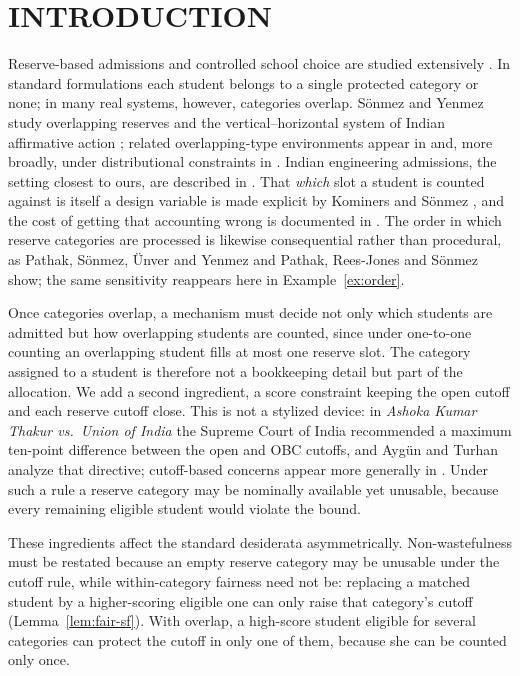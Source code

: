 \documentclass[a4paper,twoside]{article}
\theoremstyle{definition}
\begin{document}
\section{\uppercase{Introduction}}
Reserve-based admissions and controlled school choice are studied extensively \cite{Abdu05a,EHYY14a,HYY13a,EcYe15a,AyTu20a,AyTu23a}. In standard formulations each student belongs to a single protected category or none; in many real systems, however, categories overlap. S\"onmez and Yenmez study overlapping reserves \cite{SoYe20a} and the vertical--horizontal system of Indian affirmative action \cite{SoYe22a}; related overlapping-type environments appear in \cite{KHIY17a,AyBo21a,DKT23a} and, more broadly, under distributional constraints in \cite{GKK+17a,KaKo24a}. Indian engineering admissions, the setting closest to ours, are described in \cite{BCC+19b}. That \emph{which} slot a student is counted against is itself a design variable is made explicit by Kominers and S\"onmez \cite{KoSo16a}, and the cost of getting that accounting wrong is documented in \cite{DKPS18a}. The order in which reserve categories are processed is likewise consequential rather than procedural, as Pathak, S\"onmez, \"Unver and Yenmez \cite{PSUY24a} and Pathak, Rees-Jones and S\"onmez \cite{PRS23a} show; the same sensitivity reappears here in Example~\ref{ex:order}.

Once categories overlap, a mechanism must decide not only which students are admitted but how overlapping students are counted, since under one-to-one counting an overlapping student fills at most one reserve slot. The category assigned to a student is therefore not a bookkeeping detail but part of the allocation. We add a second ingredient, a score constraint keeping the open cutoff and each reserve cutoff close. This is not a stylized device: in \emph{Ashoka Kumar Thakur vs.\ Union of India} the Supreme Court of India recommended a maximum ten-point difference between the open and OBC cutoffs, and Ayg\"un and Turhan \cite{AyTu23b} analyze that directive; cutoff-based concerns appear more generally in \cite{AyTu23a,ABB24a}. Under such a rule a reserve category may be nominally available yet unusable, because every remaining eligible student would violate the bound.

These ingredients affect the standard desiderata \cite{EHYY14a,KHIY17a,GKK+17a} asymmetrically. Non-wastefulness must be restated because an empty reserve category may be unusable under the cutoff rule, while within-category fairness need not be: replacing a matched student by a higher-scoring eligible one can only raise that category's cutoff (Lemma~\ref{lem:fair-sf}). With overlap, a high-score student eligible for several categories can protect the cutoff in only one of them, because she can be counted only once.
\end{document}

